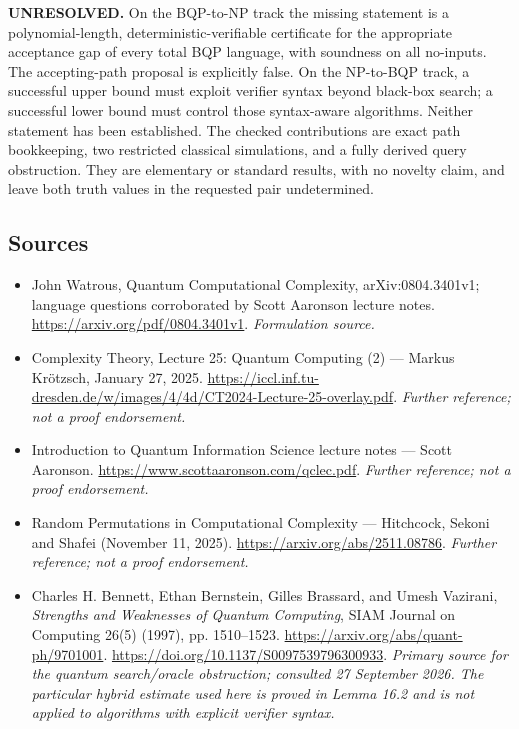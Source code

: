 \documentclass[11pt]{article}
\begin{document}
\textbf{UNRESOLVED.} On the BQP-to-NP track the missing statement is a
polynomial-length, deterministic-verifiable certificate for the appropriate
acceptance gap of every total BQP language, with soundness on all no-inputs.
The accepting-path proposal is explicitly false. On the NP-to-BQP track,
a successful upper bound must exploit verifier syntax beyond black-box
search; a successful lower bound must control those syntax-aware algorithms.
Neither statement has been established. The checked contributions are exact
path bookkeeping, two restricted classical simulations, and a fully derived
query obstruction. They are elementary or standard results, with no novelty
claim, and leave both truth values in the requested pair undetermined.

\subsection{Sources}
\begin{itemize}
\item[S1]John Watrous, Quantum Computational Complexity, arXiv:0804.3401v1; language questions corroborated by Scott Aaronson lecture notes.
\url{https://arxiv.org/pdf/0804.3401v1}.
\textit{Formulation source.}
\item[S2]Complexity Theory, Lecture 25: Quantum Computing (2) — Markus Krötzsch, January 27, 2025.
\url{https://iccl.inf.tu-dresden.de/w/images/4/4d/CT2024-Lecture-25-overlay.pdf}.
\textit{Further reference; not a proof endorsement.}
\item[S3]Introduction to Quantum Information Science lecture notes — Scott Aaronson.
\url{https://www.scottaaronson.com/qclec.pdf}.
\textit{Further reference; not a proof endorsement.}
\item[S4]Random Permutations in Computational Complexity — Hitchcock, Sekoni and Shafei (November 11, 2025).
\url{https://arxiv.org/abs/2511.08786}.
\textit{Further reference; not a proof endorsement.}
\item[E1]Charles H. Bennett, Ethan Bernstein, Gilles Brassard, and
Umesh Vazirani, \emph{Strengths and Weaknesses of Quantum Computing},
SIAM Journal on Computing 26(5) (1997), pp. 1510--1523.
\url{https://arxiv.org/abs/quant-ph/9701001}.
\url{https://doi.org/10.1137/S0097539796300933}.
\textit{Primary source for the quantum search/oracle obstruction; consulted
27 September 2026. The particular hybrid estimate used here is proved in
Lemma 16.2 and is not applied to algorithms with explicit verifier syntax.}
\end{itemize}
\end{document}
